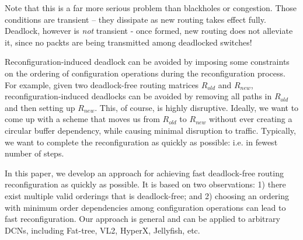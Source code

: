 Note that this is a far more serious problem than blackholes or congestion.
Those conditions are transient -- they dissipate as new routing takes effect
fully. Deadlock, however is {\em not} transient - once formed, new routing does
not alleviate it, since no packts are being transmitted among deadlocked
switches!

Reconfiguration-induced deadlock can be avoided by imposing some constraints on
the ordering of configuration operations during the reconfiguration process. For
example, given two deadlock-free routing matrices $R_{old}$ and $R_{new}$,
reconfiguration-induced deadlocks can be avoided by removing all paths in
$R_{old}$ and then setting up $R_{new}$. This, of course, is highly disruptive.
Ideally, we want to come up with a scheme that moves us from $R_{old}$ to
$R_{new}$ without ever creating a circular buffer dependency, while causing
minimal disruption to traffic. Typically, we want to complete the
reconfiguration as quickly as possible: i.e. in fewest number of steps. 

In this paper, we  develop an approach for achieving fast deadlock-free routing
reconfiguration as quickly as possible. It is based on two observations: 1)
there exist multiple  valid orderings that is deadlock-free; and 2) choosing an
ordering with minimum order dependencies among configuration operations can lead to
fast reconfiguration. Our approach is general and can be applied to arbitrary
DCNs, including Fat-tree, VL2, HyperX, Jellyfish, etc. 
